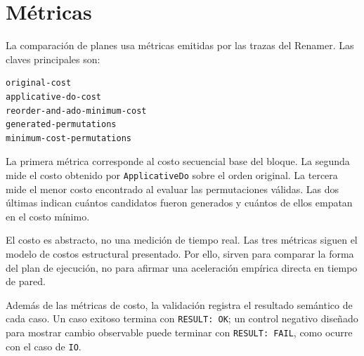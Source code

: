 
\section{Métricas}

La comparación de planes usa métricas emitidas por las trazas del Renamer. Las claves principales son:

\begin{verbatim}
original-cost
applicative-do-cost
reorder-and-ado-minimum-cost
generated-permutations
minimum-cost-permutations
\end{verbatim}

La primera métrica corresponde al costo secuencial base del bloque. La segunda mide el costo obtenido por \texttt{ApplicativeDo} sobre el orden original. La tercera mide el menor costo encontrado al evaluar las permutaciones válidas. Las dos últimas indican cuántos candidatos fueron generados y cuántos de ellos empatan en el costo mínimo.

El costo es abstracto, no una medición de tiempo real. Las tres métricas siguen el modelo de costos estructural presentado. Por ello, sirven para comparar la forma del plan de ejecución, no para afirmar una aceleración empírica directa en tiempo de pared.

Además de las métricas de costo, la validación registra el resultado semántico de cada caso. Un caso exitoso termina con \texttt{RESULT: OK}; un control negativo diseñado para mostrar cambio observable puede terminar con \texttt{RESULT: FAIL}, como ocurre con el caso de \texttt{IO}.
